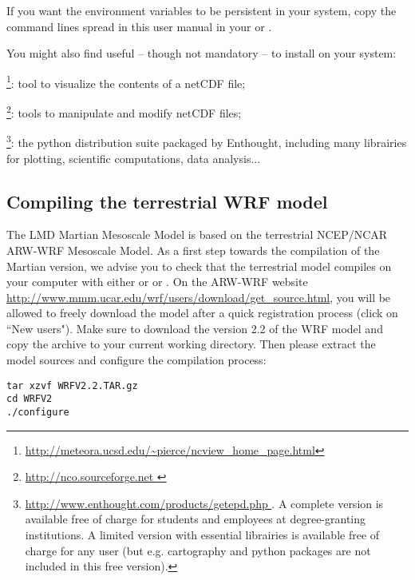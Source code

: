 \sk
\begin{finger}
\item If you want the environment variables to be persistent in your system, copy the  command lines spread in this user manual in your  or . 
\item You might also find useful -- though not mandatory -- to install on your system:
\begin{citemize}
\item {}\footnote{ \url{http://meteora.ucsd.edu/~pierce/ncview\_home\_page.html} }: tool to visualize the contents of a netCDF file;
\item {}\footnote{ \url{ http://nco.sourceforge.net } }: tools to manipulate and modify netCDF files;
\item {}\footnote{ \url{ http://www.enthought.com/products/getepd.php }. A complete version is available free of charge for students and employees at degree-granting institutions. A limited version with essential librairies is available free of charge for any user (but e.g. cartography and  python packages are not included in this free version). }: the python distribution suite packaged by Enthought, including many librairies for plotting, scientific computations, data analysis...
\end{citemize}
\end{finger}

\sk
\subsection{Compiling the terrestrial WRF model}\label{terrestrial}

\sk The LMD Martian Mesoscale Model is based on the terrestrial NCEP/NCAR ARW-WRF Mesoscale Model. As a first step towards the compilation of the Martian version, we advise you to check that the terrestrial model compiles on your computer with either  or  or . On the ARW-WRF website \url{http://www.mmm.ucar.edu/wrf/users/download/get\_source.html}, you will be allowed to freely download the model after a quick registration process (click on ``New users"). Make sure to download the version 2.2 of the WRF model and copy the  archive to your current working directory. Then please extract the model sources and configure the compilation process:
\begin{verbatim}
tar xzvf WRFV2.2.TAR.gz
cd WRFV2
./configure
\end{verbatim}

